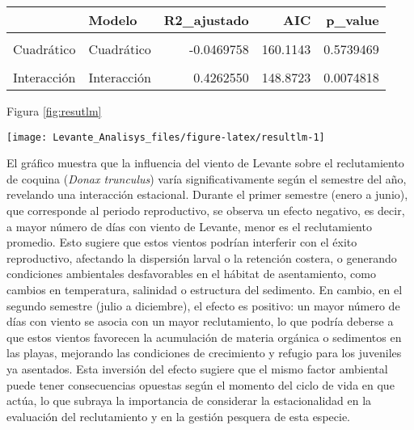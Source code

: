 \documentclass[
]{article}
\begin{document}
\begin{table}[!h]
\centering
\begin{tabular}[t]{l|l|r|r|r}
\hline
  & Modelo & R2\_ajustado & AIC & p\_value\\
\hline
\cellcolor{gray!10}{Lineal} & \cellcolor{gray!10}{Lineal} & \cellcolor{gray!10}{-0.0554818} & \cellcolor{gray!10}{159.4193} & \cellcolor{gray!10}{0.9720995}\\
\hline
Cuadrático & Cuadrático & -0.0469758 & 160.1143 & 0.5739469\\
\hline
\cellcolor{gray!10}{Con semestre} & \cellcolor{gray!10}{Con semestre} & \cellcolor{gray!10}{0.3456430} & \cellcolor{gray!10}{150.7142} & \cellcolor{gray!10}{0.0105642}\\
\hline
Interacción & Interacción & 0.4262550 & 148.8723 & 0.0074818\\
\hline
\end{tabular}
\end{table}

Figura \ref{fig:resutlm}

\begin{center}\texttt{[image: Levante\_Analisys\_files/figure-latex/resultlm-1]} \end{center}

El gráfico muestra que la influencia del viento de Levante sobre el reclutamiento de coquina (\emph{Donax trunculus}) varía significativamente según el semestre del año, revelando una interacción estacional. Durante el primer semestre (enero a junio), que corresponde al periodo reproductivo, se observa un efecto negativo, es decir, a mayor número de días con viento de Levante, menor es el reclutamiento promedio. Esto sugiere que estos vientos podrían interferir con el éxito reproductivo, afectando la dispersión larval o la retención costera, o generando condiciones ambientales desfavorables en el hábitat de asentamiento, como cambios en temperatura, salinidad o estructura del sedimento. En cambio, en el segundo semestre (julio a diciembre), el efecto es positivo: un mayor número de días con viento se asocia con un mayor reclutamiento, lo que podría deberse a que estos vientos favorecen la acumulación de materia orgánica o sedimentos en las playas, mejorando las condiciones de crecimiento y refugio para los juveniles ya asentados. Esta inversión del efecto sugiere que el mismo factor ambiental puede tener consecuencias opuestas según el momento del ciclo de vida en que actúa, lo que subraya la importancia de considerar la estacionalidad en la evaluación del reclutamiento y en la gestión pesquera de esta especie.
\end{document}
